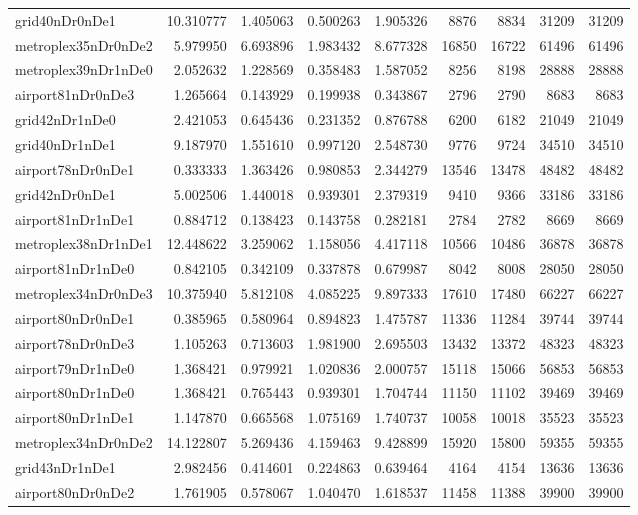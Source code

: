 \begin{longtable}{|l|r|r|r|r|r|r|r|r|}
grid40nDr0nDe1 & 10.310777 & 1.405063 & 0.500263 & 1.905326 & 8876 & 8834 & 31209 & 31209 \\
metroplex35nDr0nDe2 & 5.979950 & 6.693896 & 1.983432 & 8.677328 & 16850 & 16722 & 61496 & 61496 \\
metroplex39nDr1nDe0 & 2.052632 & 1.228569 & 0.358483 & 1.587052 & 8256 & 8198 & 28888 & 28888 \\
airport81nDr0nDe3 & 1.265664 & 0.143929 & 0.199938 & 0.343867 & 2796 & 2790 & 8683 & 8683 \\
grid42nDr1nDe0 & 2.421053 & 0.645436 & 0.231352 & 0.876788 & 6200 & 6182 & 21049 & 21049 \\
grid40nDr1nDe1 & 9.187970 & 1.551610 & 0.997120 & 2.548730 & 9776 & 9724 & 34510 & 34510 \\
airport78nDr0nDe1 & 0.333333 & 1.363426 & 0.980853 & 2.344279 & 13546 & 13478 & 48482 & 48482 \\
grid42nDr0nDe1 & 5.002506 & 1.440018 & 0.939301 & 2.379319 & 9410 & 9366 & 33186 & 33186 \\
airport81nDr1nDe1 & 0.884712 & 0.138423 & 0.143758 & 0.282181 & 2784 & 2782 & 8669 & 8669 \\
metroplex38nDr1nDe1 & 12.448622 & 3.259062 & 1.158056 & 4.417118 & 10566 & 10486 & 36878 & 36878 \\
airport81nDr1nDe0 & 0.842105 & 0.342109 & 0.337878 & 0.679987 & 8042 & 8008 & 28050 & 28050 \\
metroplex34nDr0nDe3 & 10.375940 & 5.812108 & 4.085225 & 9.897333 & 17610 & 17480 & 66227 & 66227 \\
airport80nDr0nDe1 & 0.385965 & 0.580964 & 0.894823 & 1.475787 & 11336 & 11284 & 39744 & 39744 \\
airport78nDr0nDe3 & 1.105263 & 0.713603 & 1.981900 & 2.695503 & 13432 & 13372 & 48323 & 48323 \\
airport79nDr1nDe0 & 1.368421 & 0.979921 & 1.020836 & 2.000757 & 15118 & 15066 & 56853 & 56853 \\
airport80nDr1nDe0 & 1.368421 & 0.765443 & 0.939301 & 1.704744 & 11150 & 11102 & 39469 & 39469 \\
airport80nDr1nDe1 & 1.147870 & 0.665568 & 1.075169 & 1.740737 & 10058 & 10018 & 35523 & 35523 \\
metroplex34nDr0nDe2 & 14.122807 & 5.269436 & 4.159463 & 9.428899 & 15920 & 15800 & 59355 & 59355 \\
grid43nDr1nDe1 & 2.982456 & 0.414601 & 0.224863 & 0.639464 & 4164 & 4154 & 13636 & 13636 \\
airport80nDr0nDe2 & 1.761905 & 0.578067 & 1.040470 & 1.618537 & 11458 & 11388 & 39900 & 39900 \\

\end{longtable}
